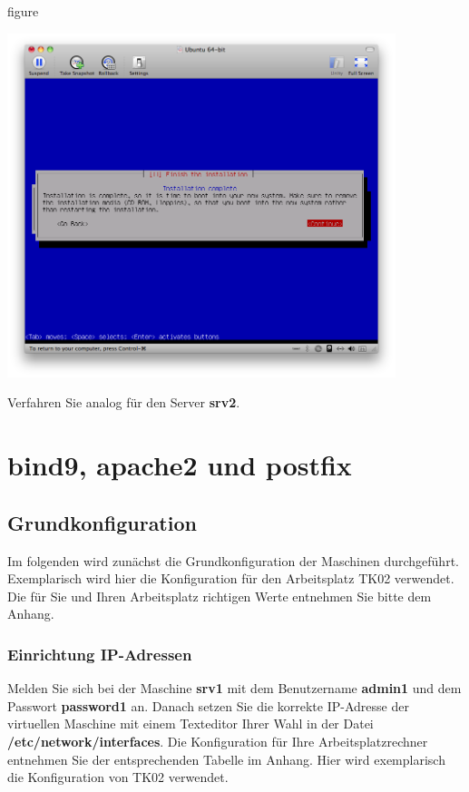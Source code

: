 \begin{nofloat}{figure}
\begin{center}
\includegraphics[width=0.85\textwidth]{screenshots/37_ubuntu_install.png}
\end{center}
\end{nofloat}

Verfahren Sie analog für den Server \textbf{srv2}.

\section{bind9, apache2 und postfix}

\subsection{Grundkonfiguration}

Im folgenden wird zunächst die Grundkonfiguration der Maschinen durchgeführt. Exemplarisch wird hier die Konfiguration für den Arbeitsplatz TK02 verwendet. Die für Sie
und Ihren Arbeitsplatz richtigen Werte entnehmen Sie bitte dem Anhang.

\subsubsection{Einrichtung IP-Adressen}

Melden Sie sich bei der Maschine \textbf{srv1} mit dem Benutzername \textbf{admin1} und dem Passwort \textbf{password1} an. Danach 
setzen Sie die korrekte IP-Adresse der virtuellen Maschine mit einem Texteditor Ihrer Wahl in der Datei \\
\textbf{/etc/network/interfaces}. Die Konfiguration für Ihre Arbeitsplatzrechner entnehmen Sie der entsprechenden Tabelle im Anhang. Hier wird exemplarisch die Konfiguration
von TK02 verwendet.

